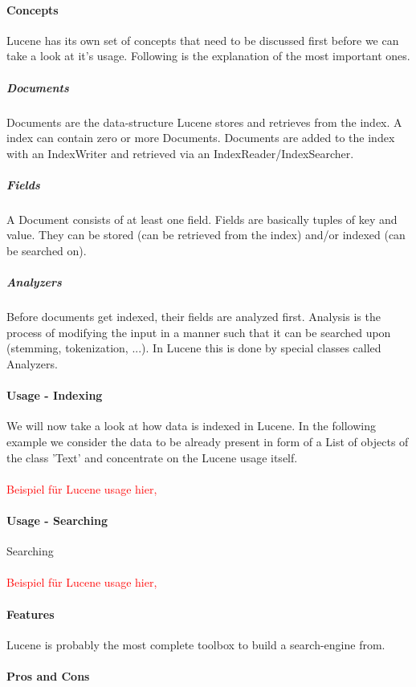\paragraph{Concepts} Lucene has its own set of concepts that need to be discussed first before we can take a look at it's usage. Following is the explanation of the most important ones.

\subparagraph{Documents}
Documents are the data-structure Lucene stores and retrieves from the index. A index can contain zero or more Documents. Documents are added to the index with an IndexWriter and retrieved via an IndexReader/IndexSearcher.

\subparagraph{Fields}
A Document consists of at least one field. Fields are basically tuples of key and value. They can be stored (can be retrieved from the index) and/or indexed (can be searched on).

\subparagraph{Analyzers}
Before documents get indexed, their fields are analyzed first. Analysis is the process of modifying the input in a manner such that it can be searched upon (stemming, tokenization, ...). In Lucene this is done by special classes called Analyzers.

\paragraph{Usage - Indexing}
We will now take a look at how data is indexed in Lucene. In the following example we consider the data to be already present in form of a List of objects of the class 'Text' and concentrate on the Lucene usage itself.
\\\\
\textcolor{red}{Beispiel für Lucene usage hier, }

\paragraph{Usage - Searching}
Searching\\\\
\textcolor{red}{Beispiel für Lucene usage hier, }

\paragraph{Features}
Lucene is probably the most complete toolbox to build a search-engine from.

\paragraph{Pros and Cons}

